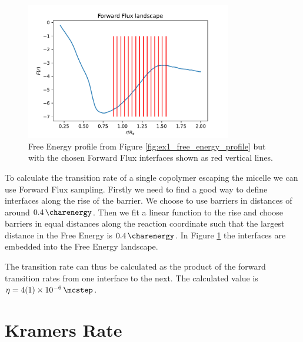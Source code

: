 \documentclass[../main.tex]{subfiles}
\begin{document}
\begin{figure}[htpb]
    \centering
    \includegraphics[width=0.8\textwidth]{../figures/ex2_forward_flux_landscape.pdf}
    \caption{Free Energy profile from Figure \ref{fig:ex1_free_energy_profile} but with the chosen Forward Flux interfaces shown as red vertical lines.}
    \label{fig:ex2_forward_flux_landscape}
\end{figure}

To calculate the transition rate of a single copolymer escaping the micelle we can use Forward Flux sampling.
Firstly we need to find a good way to define interfaces along the rise of the barrier.
We choose to use barriers in distances of around $\SI{.4}{\charenergy}$.
Then we fit a linear function to the rise and choose barriers in equal distances along the reaction coordinate such that the largest distance in the Free Energy is $\SI{.4}{\charenergy}$.
In Figure \ref{fig:ex2_forward_flux_landscape} the interfaces are embedded into the Free Energy landscape.
\par

The transition rate can thus be calculated as the product of the forward transition rates from one interface to the next.
The calculated value is $\eta = \SI{4+-1e-6}{\per\mcstep}$.

\section{Kramers Rate}
\end{document}
